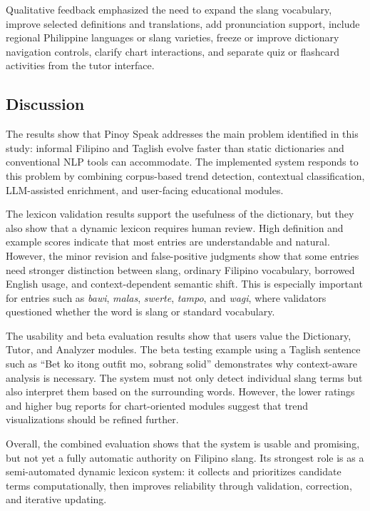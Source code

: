 Qualitative feedback emphasized the need to expand the slang vocabulary, improve selected definitions and translations, add pronunciation support, include regional Philippine languages or slang varieties, freeze or improve dictionary navigation controls, clarify chart interactions, and separate quiz or flashcard activities from the tutor interface.

\subsection{Discussion}

The results show that Pinoy Speak addresses the main problem identified in this study: informal Filipino and Taglish evolve faster than static dictionaries and conventional NLP tools can accommodate. The implemented system responds to this problem by combining corpus-based trend detection, contextual classification, LLM-assisted enrichment, and user-facing educational modules.

The lexicon validation results support the usefulness of the dictionary, but they also show that a dynamic lexicon requires human review. High definition and example scores indicate that most entries are understandable and natural. However, the minor revision and false-positive judgments show that some entries need stronger distinction between slang, ordinary Filipino vocabulary, borrowed English usage, and context-dependent semantic shift. This is especially important for entries such as \textit{bawi}, \textit{malas}, \textit{swerte}, \textit{tampo}, and \textit{wagi}, where validators questioned whether the word is slang or standard vocabulary.

The usability and beta evaluation results show that users value the Dictionary, Tutor, and Analyzer modules. The beta testing example using a Taglish sentence such as ``Bet ko itong outfit mo, sobrang solid'' demonstrates why context-aware analysis is necessary. The system must not only detect individual slang terms but also interpret them based on the surrounding words. However, the lower ratings and higher bug reports for chart-oriented modules suggest that trend visualizations should be refined further.

Overall, the combined evaluation shows that the system is usable and promising, but not yet a fully automatic authority on Filipino slang. Its strongest role is as a semi-automated dynamic lexicon system: it collects and prioritizes candidate terms computationally, then improves reliability through validation, correction, and iterative updating.

